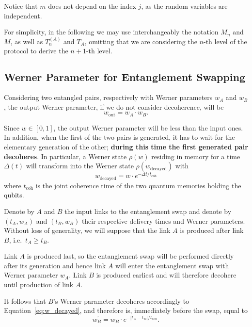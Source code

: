 \documentclass{masterthesis}
\begin{document}
Notice that $m$ does not depend on the index $j$, as the random variables are independent.

For simplicity, in the following we may use interchangeably the notation $M_n$ and $M$, as well as $T_n^{(A)}$ and $T_A$, omitting that we are considering the $n$-th level of the protocol to derive the $n+1$-th level.

\subsection{Werner Parameter for Entanglement Swapping}

Considering two entangled pairs, respectively with Werner parameters $w_A$ and $w_B$, the output Werner parameter, if we do not consider decoherence, will be %
\begin{equation}
    w_\text{out} = w_A \cdot w_B .
\end{equation}

Since $w \in [0, 1]$, the output Werner parameter will be less than the input ones.
In addition, when the first of the two pairs is generated, it has to wait for the elementary generation of the other; \textbf{during this time the first generated pair decoheres}. In particular, a Werner state $\rho(w)$ residing in memory for a time $\Delta(t)$ will transform into the Werner state $\rho(w_{\text{decayed}})$ with 
\begin{equation}\label{eq:w_decayed}
    w_{\text{decayed}} = w \cdot e^{-\Delta t / t_\text{coh}}
\end{equation}
where $t_\text{coh}$ is the joint coherence time of the two quantum memories holding the qubits. %

Denote by $A$ and $B$ the input links to the entanglement swap and denote by $\left(t_{A}, w_{A}\right)$ and $\left(t_{B}, w_{B}\right)$ their respective delivery times and Werner parameters. 
Without loss of generality, we will suppose that the link $A$ is produced after link $B$, i.e.\ $t_{A} \geq t_{B}$. 

Link $A$ is produced last, so the entanglement swap will be performed directly after its generation and hence link $A$ will enter the entanglement swap with Werner parameter $w_{A}$. Link $B$ is produced earliest and will therefore decohere until production of link $A$.

It follows that $B$'s Werner parameter decoheres accordingly to Equation~\ref{eq:w_decayed}, and therefore is, immediately before the swap, equal to
\begin{equation*}
    w_{B}^{\prime} = w_{B} \cdot e^{-\left|t_{A}-t_{B}\right| / t_\text{coh}} .
\end{equation*}
\end{document}
